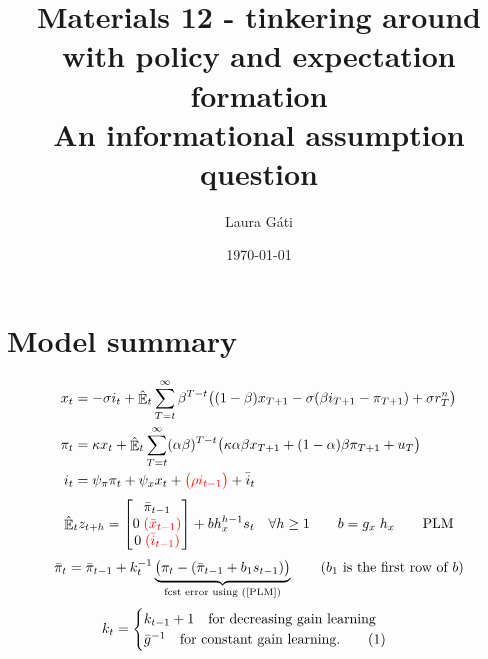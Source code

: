 \documentclass[11pt]{article}
\renewcommand{\[}{\begin{equation}}
\renewcommand{\]}{\end{equation}}
\DeclareMathOperator{\E}{\mathbb{E}}
\newcommand\numberthis{\addtocounter{equation}{1}\tag{\theequation}} %
\begin{document}
\linespread{1.0}

\title{Materials 12 - tinkering around with policy and expectation formation \\
An informational assumption question}
\author{Laura G\'ati} 
\date{\today}
\maketitle


\tableofcontents


\newpage
\section{Model summary}
\begin{align}
x_t &=  -\sigma i_t +\hat{\E}_t \sum_{T=t}^{\infty} \beta^{T-t }\big( (1-\beta)x_{T+1} - \sigma(\beta i_{T+1} - \pi_{T+1}) +\sigma r_T^n \big)  \label{prestons18}  \\
\pi_t &= \kappa x_t +\hat{\E}_t \sum_{T=t}^{\infty} (\alpha\beta)^{T-t }\big( \kappa \alpha \beta x_{T+1} + (1-\alpha)\beta \pi_{T+1} + u_T\big) \label{prestons19}  \\
i_t &= \psi_{\pi}\pi_t + \psi_{x} x_t  + \textcolor{red}{\big(\rho i_{t-1}\big)} + \bar{i}_t \label{TR}
\end{align}
\begin{equation}
\hat{\E}_t z_{t+h} =  \begin{bmatrix}\bar{\pi}_{t-1} \\ 0 \; \textcolor{red}{(\bar{x}_{t-1}) } \\ 0 \; \textcolor{red}{(\bar{i}_{t-1}) } \end{bmatrix}+ bh_x^{h-1}s_t  \quad \forall h\geq 1 \quad \quad b = g_x \; h_x \quad \quad \text{PLM} \label{PLM}
\end{equation}
\begin{equation}
\bar{\pi}_{t} = \bar{\pi}_{t-1} +k_t^{-1}\underbrace{\big(\pi_{t} -(\bar{\pi}_{t-1}+b_1s_{t-1}) \big)}_{\text{fcst error using (\ref{PLM})} } \quad \quad  \text{($b_1$ is the first row of $b$)}
\end{equation}
 \begin{align*}
k_t & = \begin{cases} k_{t-1}+1 \quad \text{for decreasing gain learning}  \\ \bar{g}^{-1}  \quad \text{for constant gain learning.}\numberthis
\end{cases} 
\end{align*}
\end{document}
